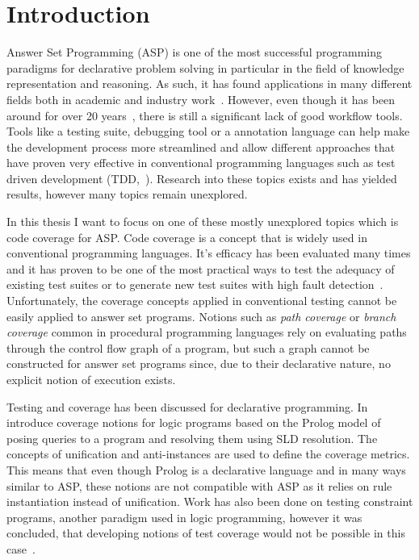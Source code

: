 \chapter{Introduction}
\label{ch:Introduction}
Answer Set Programming (ASP) is one of the most successful programming paradigms for declarative problem solving in particular in the field of knowledge representation and reasoning. As such, it has found applications in many different fields both in academic and industry work~\cite{EGL16}.
However, even though it has been around for over 20 years~\cite{Nie99, MT98}, there is still a significant lack of good workflow tools. Tools like a testing suite, debugging tool or a annotation language can help make the development process more streamlined and allow different approaches that have proven very effective in conventional programming languages such as test driven development (TDD,~\cite{Fra+03}). Research into these topics exists and has yielded results, however many topics remain unexplored.

In this thesis I want to focus on one of these mostly unexplored topics which is code coverage for ASP. Code coverage is a concept that is widely used in conventional programming languages. It's efficacy has been evaluated many times and it has proven to be one of the most practical ways to test the adequacy of existing test suites or to generate new test suites with high fault detection~\cite{GJG14}.
Unfortunately, the coverage concepts applied in conventional testing cannot be easily applied to answer set programs. Notions such as \emph{path coverage} or \emph{branch coverage} common in procedural programming languages rely on evaluating paths through the control flow graph of a program, but such a graph cannot be constructed for answer set programs since, due to their declarative nature, no explicit notion of execution exists.

Testing and coverage has been discussed for declarative programming. In~\cite{BJ98} \citeauthor{BJ98} introduce coverage notions for logic programs based on the Prolog model of posing queries to a program and resolving them using SLD resolution. The concepts of unification and anti-instances are used to define the coverage metrics. This means that even though Prolog is a declarative language and in many ways similar to ASP, these notions are not compatible with ASP as it relies on rule instantiation instead of unification.
Work has also been done on testing constraint programs, another paradigm used in logic programming, however it was concluded, that developing notions of test coverage would not be possible in this case~\cite{LGL10}.

